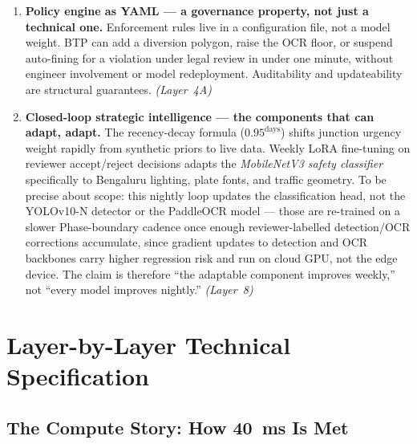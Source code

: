\documentclass[11pt,a4paper]{article}
\begin{document}
\begin{enumerate}[leftmargin=1.8em, itemsep=0.6em]
    \item \textbf{Policy engine as YAML — a governance property, not just a technical one.}
    Enforcement rules live in a configuration file, not a model weight. BTP can add a diversion polygon, raise the OCR floor, or suspend auto-fining for a violation under legal review in under one minute, without engineer involvement or model redeployment. Auditability and updateability are structural guarantees. \textit{(Layer~4A)}

    \item \textbf{Closed-loop strategic intelligence — the components that can adapt, adapt.}
    The recency-decay formula ($0.95^{\text{days}}$) shifts junction urgency weight rapidly from synthetic priors to live data. Weekly LoRA fine-tuning on reviewer accept/reject decisions adapts the \emph{MobileNetV3 safety classifier} specifically to Bengaluru lighting, plate fonts, and traffic geometry. To be precise about scope: this nightly loop updates the classification head, not the YOLOv10-N detector or the PaddleOCR model --- those are re-trained on a slower Phase-boundary cadence once enough reviewer-labelled detection/OCR corrections accumulate, since gradient updates to detection and OCR backbones carry higher regression risk and run on cloud GPU, not the edge device. The claim is therefore ``the adaptable component improves weekly,'' not ``every model improves nightly.'' \textit{(Layer~8)}

\end{enumerate}

\section{Layer-by-Layer Technical Specification}
\label{sec:layerspec}

\subsection*{The Compute Story: How 40~ms Is Met}
\end{document}
